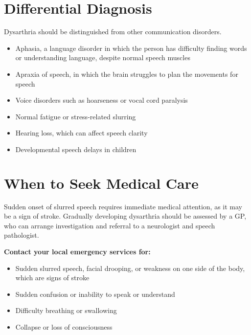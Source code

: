 \section*{Differential Diagnosis}
Dysarthria should be distinguished from other communication disorders.
\begin{itemize}
    \item Aphasia, a language disorder in which the person has difficulty finding words or understanding language, despite normal speech muscles
    \item Apraxia of speech, in which the brain struggles to plan the movements for speech
    \item Voice disorders such as hoarseness or vocal cord paralysis
    \item Normal fatigue or stress-related slurring
    \item Hearing loss, which can affect speech clarity
    \item Developmental speech delays in children
\end{itemize}

\section*{When to Seek Medical Care}
Sudden onset of slurred speech requires immediate medical attention, as it may be a sign of stroke. Gradually developing dysarthria should be assessed by a GP, who can arrange investigation and referral to a neurologist and speech pathologist.

\textbf{Contact your local emergency services for:}
\begin{itemize}
    \item Sudden slurred speech, facial drooping, or weakness on one side of the body, which are signs of stroke
    \item Sudden confusion or inability to speak or understand
    \item Difficulty breathing or swallowing
    \item Collapse or loss of consciousness
\end{itemize}


